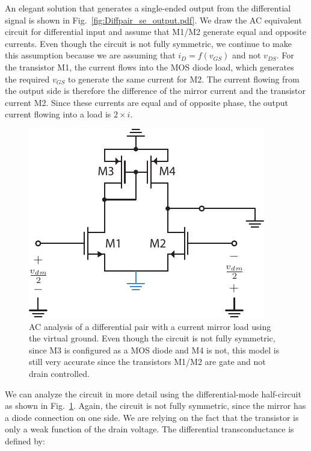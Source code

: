 An elegant solution that generates a single-ended output from the differential signal is shown in Fig.~\ref{fig:Diffpair_se_output.pdf}.  We draw the AC equivalent circuit for differential input and assume that M1/M2 generate equal and opposite currents.  Even though the circuit is not fully symmetric, we continue to make this assumption because we are assuming that $i_D = f(v_{GS})$ and not $v_{DS}$.  For the transistor M1, the current flows into the MOS diode load, which generates the required $v_{GS}$ to generate the same current for M2.  The current flowing from the output side is therefore the difference of the mirror current and the transistor current M2.  Since these currents are equal and of opposite phase, the output current flowing into a load is $2\times i$. 
\begin{figure}[tb]
\centering
\includegraphics[scale=1]{Diffpair_se_ac_gm.pdf} 
\caption{AC analysis of a differential pair with a current mirror load using the virtual ground.  Even though the circuit is not fully symmetric, since M3 is configured as a MOS diode and M4 is not, this model is still very accurate since the transistors M1/M2 are gate and not drain controlled.} \label{fig:Diffpair_se_ac_gm.pdf}
\end{figure}
We can analyze the circuit in more detail using the differential-mode half-circuit as shown in Fig.~\ref{fig:Diffpair_se_ac_gm.pdf}.  Again, the circuit is not fully symmetric, since the mirror has a diode connection on one side.  We are relying on the fact that the transistor is only a weak function of the drain voltage.  The differential transconductance is defined by:
